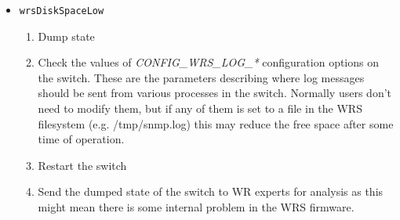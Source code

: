 \begin{itemize}
  \item \texttt{wrsDiskSpaceLow}
    \begin{enumerate}
      \item Dump state
      \item Check the values of \emph{CONFIG\_WRS\_LOG\_*} configuration options
        on the switch. These are the parameters describing where log messages
        should be sent from various processes in the switch. Normally users
        don't need to modify them, but if any of them is set to a file in the
        WRS filesystem (e.g. /tmp/snmp.log) this may reduce the free space after
        some time of operation.
      \item Restart the switch
      \item Send the dumped state of the switch to WR experts for analysis as
        this might mean there is some internal problem in the WRS firmware.
    \end{enumerate}

\end{itemize}

